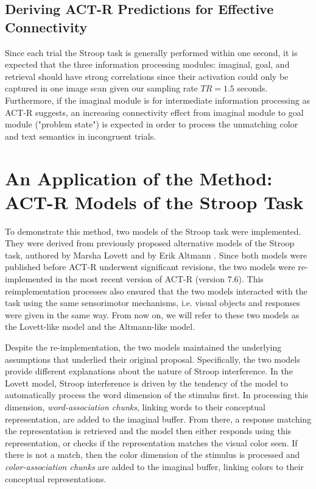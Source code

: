 \documentclass[10pt,letterpaper]{article}
\begin{document}
\subsection{Deriving ACT-R Predictions for Effective Connectivity }

Since each trial the Stroop task is generally performed within one second, it is expected that the three information processing modules: imaginal, goal, and retrieval should have strong correlations since their activation could only be captured in one image scan given our sampling rate $TR = 1.5$ seconds. Furthermore, if the imaginal module is for intermediate information processing as ACT-R suggests, an increasing connectivity effect from imaginal module to goal module ("problem state") is expected in order to process the unmatching color and text semantics in incongruent trials.

\section{An Application of the Method: ACT-R Models of the Stroop Task}

To demonstrate this method, two models of the Stroop task were implemented. They were derived from previously proposed alternative models of the Stroop task, authored by Marsha Lovett \cite{Lovett2005} and by Erik Altmann \cite{VanMaanen2009}. Since both models were published before ACT-R underwent significant revisions, the two models were re-implemented in the most recent version of ACT-R (version 7.6). This reimplementation processes also ensured that the two models interacted with the task using the same sensorimotor mechanisms, i.e. visual objects and responses were given in the same way. From now on, we will refer to these two models as the Lovett-like model and the Altmann-like model. 

Despite the re-implementation, the two models maintained the underlying assumptions that underlied their original proposal. Specifically, the two models provide different explanations about the nature of Stroop interference. In the Lovett model, Stroop interference is driven by the tendency of the model to automatically process the word dimension of the stimulus first. In processing this dimension, \textit{word-association chunks}, linking words to their conceptual representation, are added to the imaginal buffer. From there, a response matching the representation is retrieved and the model then either responds using this representation, or checks if the representation matches the visual color seen. If there is not a match, then the color dimension of the stimulus is processed and \textit{color-association chunks} are added to the imaginal buffer, linking colors to their conceptual representations. 
\end{document}
